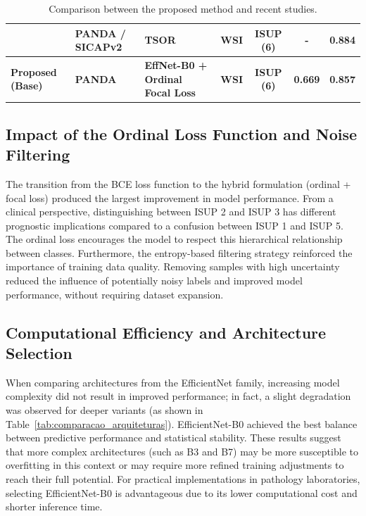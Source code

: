 \begin{table}[htb]
{\begin{tabular}{llllccc}
			\cite{bhattacharyya2026tsor}
			& PANDA / SICAPv2
			& TSOR
			& WSI
			& ISUP (6)
			& -
			& 0.884 \\ 
			
			\midrule
			
			\textbf{Proposed (Base)} 
			& \textbf{PANDA} 
			& \textbf{EffNet-B0 + Ordinal Focal Loss} 
			& \textbf{WSI}
			& \textbf{ISUP (6)} 
			& \textbf{0.669} 
			& \textbf{0.857} \\		
			
			\bottomrule
		\end{tabular}
	}
	
	\caption{Comparison between the proposed method and recent studies.}
	\label{tab:comparacao_estado_arte}
\end{table}


\subsection{Impact of the Ordinal Loss Function and Noise Filtering}

The transition from the BCE loss function to the hybrid formulation (ordinal + focal loss) produced the largest improvement in model performance. From a clinical perspective, distinguishing between ISUP 2 and ISUP 3 has different prognostic implications compared to a confusion between ISUP 1 and ISUP 5. The ordinal loss encourages the model to respect this hierarchical relationship between classes. Furthermore, the entropy-based filtering strategy reinforced the importance of training data quality. Removing samples with high uncertainty reduced the influence of potentially noisy labels and improved model performance, without requiring dataset expansion.

\subsection{Computational Efficiency and Architecture Selection}

When comparing architectures from the EfficientNet family, increasing model complexity did not result in improved performance; in fact, a slight degradation was observed for deeper variants (as shown in Table~\ref{tab:comparacao_arquiteturas}). EfficientNet-B0 achieved the best balance between predictive performance and statistical stability. These results suggest that more complex architectures (such as B3 and B7) may be more susceptible to overfitting in this context or may require more refined training adjustments to reach their full potential. For practical implementations in pathology laboratories, selecting EfficientNet-B0 is advantageous due to its lower computational cost and shorter inference time.

